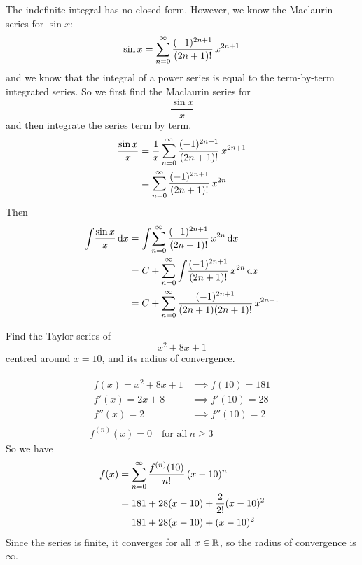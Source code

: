 \begin{solution}
  The indefinite integral has no closed form. However, we know the Maclaurin series for $\sin x$:
  \[
    \sin x = \sumto[0]{n}{\infty} \frac{(-1) ^ {2n + 1}}{(2n + 1)!} \, x ^ {2n + 1}
  \]
  and we know that the integral of a power series is equal to the term-by-term integrated series. So we first find the Maclaurin series for 
  \[
    \frac{\sin x}{x}
  \]
  and then integrate the series term by term.
  \begin{align*}
    \frac{\sin x}{x} &= \frac{1}{x} \sumto[0]{n}{\infty} \frac{(-1) ^ {2n + 1}}{(2n + 1)!} \, x ^ {2n + 1} \\
    &= \sumto[0]{n}{\infty} \frac{(-1) ^ {2n + 1}}{(2n + 1)!} \, x ^ {2n}
  \end{align*}
  Then
  \begin{align*}
    \int \! \frac{\sin x}{x} \di x &= \int \! \sumto[0]{n}{\infty} \frac{(-1) ^ {2n + 1}}{(2n + 1)!} \, x ^ {2n} \di x \\
    &= C + \sumto[0]{n}{\infty} \int \! \frac{(-1) ^ {2n + 1}}{(2n + 1)!} \, x ^ {2n} \di x \\
    &= C + \sumto[0]{n}{\infty} \frac{(-1) ^ {2n + 1}}{(2n + 1) (2n + 1)!} \, x ^ {2n + 1}
  \end{align*}
\end{solution}
\begin{eg}
  Find the Taylor series of
  \[
    x ^ 2 + 8x + 1
  \]
  centred around $x = 10$, and its radius of convergence.
\end{eg}
\begin{solution}
  \begin{gather*}
    \begin{aligned}
      f(x) = x ^ 2 + 8x + 1 &\implies f(10) = 181 \\
      f'(x) = 2x + 8 &\implies f'(10) = 28 \\
      f''(x) = 2 &\implies f''(10) = 2
    \end{aligned} \\
    f ^ {(n)} (x) = 0 \quad \text{for all} \ n \geq 3
  \end{gather*}
  So we have
  \begin{align*}
    f(x) &= \sumto[0]{n}{\infty} \frac{f ^ {(n)} (10)}{n!} \, (x - 10) ^ n \\
    &= 181 + 28 (x - 10) + \frac{2}{2!} (x - 10) ^ 2 \\
    &= 181 + 28 (x - 10) + (x - 10) ^ 2
  \end{align*}
  Since the series is finite, it converges for all $x \in \R$, so the radius of convergence is $\infty$.
\end{solution}

